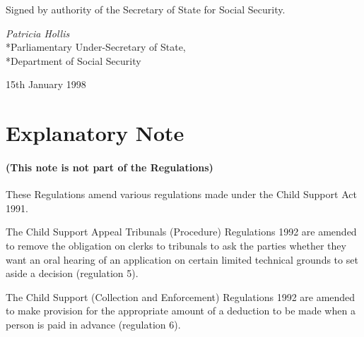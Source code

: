 \documentclass[12pt,a4paper]{article}
\begin{document}
\bigskip

Signed 
by authority of the Secretary of State for Social Security.

{\raggedleft
\emph{Patricia Hollis}\\*Parliamentary Under-Secretary of State,\\*Department of Social Security

}

15th January 1998

\small

\part{Explanatory Note}

\renewcommand\parthead{--- Explanatory Note}

\subsection*{(This note is not part of the Regulations)}

These Regulations amend various regulations made under the Child Support Act 1991.

\begin{sloppypar}
  The Child Support Appeal Tribunals (Procedure) Regulations 1992 are amended to remove the obligation on clerks to tribunals to ask the parties whether they want an oral hearing of an application on certain limited technical grounds to set aside a decision (regulation 5).
\end{sloppypar}

\begin{sloppypar}
  The Child Support (Collection and Enforcement) Regulations 1992 are amended to make provision for the appropriate amount of a deduction to be made when a person is paid in advance (regulation 6).
\end{sloppypar}
\end{document}
